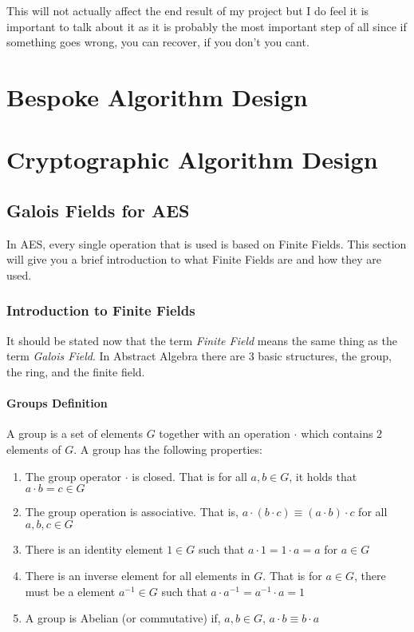 This will not actually affect the end result of my project but I do feel it is important to talk about it as it is probably the most important step of all since if something goes wrong, you can recover, if you don't you cant. 

\section{Bespoke Algorithm Design}

\section{Cryptographic Algorithm Design}

\subsection{Galois Fields for AES}

In AES, every single operation that is used is based on Finite Fields. This section will give you a brief introduction to what Finite Fields are and how they are used.

\subsubsection{Introduction to Finite Fields}

It should be stated now that the term \textit{Finite Field} means the same thing as the term \textit{Galois Field}. In Abstract Algebra there are 3 basic structures, the group, the ring, and the finite field.

\paragraph{Groups Definition}
A group is a set of elements $G$ together with an operation $\cdot$ which contains $2$ elements of $G$. A group has the following properties:
\begin{enumerate}
\item{The group operator $\cdot$ is closed. That is for all $a,b \in G$, it holds that $a \cdot b = c \in G$}
\item{The group operation is associative. That is, $a \cdot (b \cdot c) \equiv (a \cdot b) \cdot c$ for all $a,b,c \in G$}
\item{There is an identity element $1 \in G$ such that $a \cdot 1 = 1 \cdot a = a$ for $a \in G$}
\item{There is an inverse element for all elements in $G$. That is for $a \in G$, there must be a element $a^{-1} \in G$ such that $a \cdot a^{-1} = a^{-1} \cdot a = 1$}
\item{A group is Abelian (or commutative) if, $a,b \in G$, $a \cdot b \equiv b \cdot a$}
\end{enumerate}

